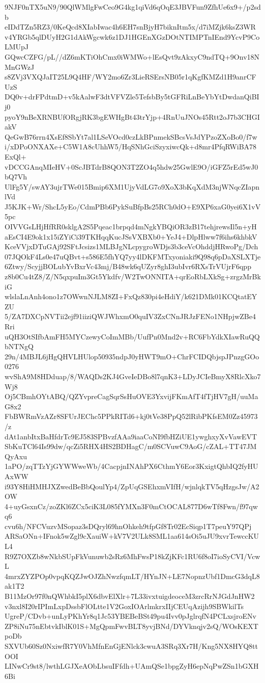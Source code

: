 9NJF0nTX5uN9/90QlWMlgFwCeo9G4kg1qiVd6qOqE3JBVFun9ZfhUe6x9+/p2sdb
eIDdTZn5RZ3/0KeQcd8XIabIwac4h6EH7snBjyH7biknItm5x/d7iMZjk6ksZ3WR
v4YRGb5qlDUyH2G1dAkWgcwk6z1DJ1HGEnXGzDOtNTIMPTnIEnd9YcvP9CoLMUpJ
GQwcCZFG/pL//dZ6mKTiOhCmx0iWMWo+lEsQvt9zAkxyC9ndTQ+9Onv18NMnGWzJ
s8ZVj3VXQJaIT25L9Q4HF/WY2mo6Zr3LieRSErsNB05r1qKgfKMZd1H9anrCFUzS
DQ0v+drFPdtmD+v5kAalwF3dtVFVZle5TefsbBy5tGFRiLnBeYbYtDwdanQiBIj0
pyoY9nBeXRNBUfORgjRK3bgEWHgBt43trYjp+4RnUuJNOs45Rtt2oJ7b3CHGIakV
QeGwB76rrn4XsEf8SbYt7al1LSeVOcd0czLkBPnmekSBcsVsJdYPzoZXoBo0/f7w
i/xDPoONXAXe+C5W1A8cUhhW5/HqSNhGciSzyxiwcQk+d8mr4PfqRWiBA78ExQl+
vDCCGAnqMIeHV+0ScJBTdrB8QON3T2ZO4q5hdw25GwlE9O/iGFZ5rEd5wJ0bQ7Vh
UlFg5Y/swAY3ujrTWe015Bmip6XM1UjyVdLG7o9XoX3bKqXdM3njWNqcZIapnlVd
J5KJK+Wr/ShcL5yEo/CdmPBb6PykSuBfpBs25RCh0dO+E9XP6xaG0yei6X1vV5pc
OIVVGsLHjHfRR0sklgA2S5Pqeac1brpqd4mNgkYBQiOR3zB17tehjrewsIl5n+yH
aEsCI4E9ok1x15iZYiCi39TKHqqKucJSsVXBXb0+YeJ4+DlpHlww7f6ihs6khbkV
KceVVjxDTuGAj92SFtJcsizs1MLBJgNLcpygroWDjs3b3ceVcOhddjHRwoPg/Dch
07JQOkF4Ls0e47uQBvt+s586E5fhYQ7yy4lDKFMTxyoniaki9Q98q6pDaXSLXTje
6Ztwy/ScyjjBOLubYvBxrVc43mj/B48wk6qUZyr8ghI3ubIvr6RXsTrVUjrF6qpp
z8b0Cu4tZ8/Z/N5qxpuIm3Gt5Ykdfv/W2TwONNITA+qrEoRbLXkSg+zrgzMrBkiG
wlslaLnAnh4ono1z7OWwnNJLM8ZI+FxQz830pi4eHdiY/k621DMk01KCQtatEYZU
5/ZA7DXCpNVTii2ejf91iiziQWJWhxmO0quIV3ZxCNnJRJzFENo1NHpjwZBe4Rri
uQH3OtSIfbAmFH5MYCzewyCoImMBb/UufPn0Mnd2v+RC6FbYdkXIawRuQQbNTNgQ
29n/4MBJL6jHgQHVLHUlop50935ndpJ0yHWT9mO+ChrFCIDQbjspJPnzgGOo0276
wvShA9M8HDduap/8/WAQDs2KJ4GveIeDBo8l7qnK3+LDyJCIeBmyX8RlcXko7Wj8
Oj5CBmhOYtABQ/QZYvpreCagSqrSsHuOVE3YxvijFKmAfT4fTjHV7gH/uuMaG8x2
FbBWRmVzAZr8SFUrJEChc5PPkRITd6+kj0tVe38PpQ52lRibPKfsEM0Zz45973/z
dAt1anbItxBaHfdrTc9EJ583SPBvzfAAa9iaaCoNI9fbHZiUE1ywghxyXvVawEVT
SbKuTCl64Is99dw/qcZi5RHX4HS2BDHagC/m0SCVuwC9AoG/cZAL+TT47JMQyAxu
1aPO/zqTTzYjGYWWweWb/4CacpjnINAhPX6CthmY6Eor3KxigtQhbIQ2fyHUAxWW
i93Y8HiHMHJXZwedBeBbQoulYp4/ZpUqGSEhxmVIfH/wjnlqkTV5qHzgsJw/A2OW
4+uyGsxnCz/zoZKl6ZCx5ciK3L085fYMXn3F0mCtOCAL877D6wTf8Fwn/f97qwq6
cvu6h/NFCVuzvMSopaz3sDQryl69hnOhkeh9tfpGf8Tr02EcSiqp1T7peuY97QPj
ARSaONn+IFnok5wZgl9cXauiW+kV7V2ULk8SML1aa614sOi5uJU9xvrTewccKUL4
R9Z7OXZb8wNkbSUpFkVunuwb2sRz6MhFwsP18kZjKFc1RU6f8oI7ioSyCVI/VcwL
4mrxZYZPOp0vpqKQZJwOJZhNwzfqmLT/HYnJN+LE7NopnzUbf1DmcG3dqL8ak1T2
B11MzOr97f0nQWhbkI5plX6dbvElXlr+7L33ivxtuigdeoceM3zrcRrNJGdJnHW2
v3nxl8I20rIPImLxpDssbFlOLtte1V2GoxIOArlmkrxIIjCEUqAzijh9SBWkilTs
UgreP/CDvb+unLyPKhYr8q1Jc53YBEBeBSt49pu4Ivv0pJglrqfN4PCLxsjroENv
ZP8iNu75nEbtvkIblK01S+MgQpmFwvBLT8yvjBNd/DYVknqjv2sQ/WOsKEXTpoDb
SXVUb60Sz0NxiwfR7Y0VhMfnEnGjENlck3cwuA3SRq3Xr7H/Kng5NX8HYQ8ttOOI
LINwCr9st8/lwthLGJXeAObLbsuIFfdh+UAmQSe1bpgZyH6epNqPwZSn1bGXH6Bi

